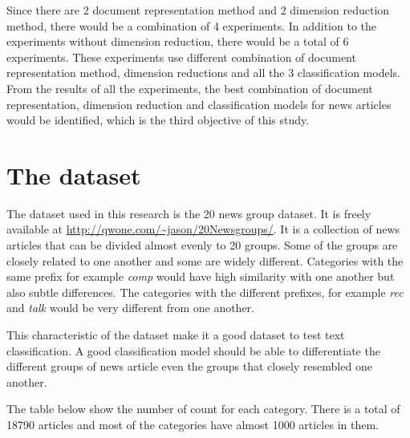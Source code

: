 Since there are 2 document representation method and 2 dimension reduction method, there would be a combination of 4 experiments. In addition to the experiments without dimension reduction, there would be a total of 6 experiments. These experiments use different combination of document representation method, dimension reductions and all the 3 classification models. From the results of all the experiments, the best combination of document representation, dimension reduction and classification models for news articles would be identified, which is the third objective of this study.\\

\section{The dataset}
\graphicspath{{./images/}}

The dataset used in this research is the 20 news group dataset. It is freely available at \url{http://qwone.com/~jason/20Newsgroups/}. It is a collection of news articles that can be divided almost evenly to 20 groups. Some of the groups are closely related to one another and some are widely different. Categories with the same prefix for example \textit{comp} would have high similarity with one another but also subtle differences. The categories with the different prefixes, for example \textit{rec} and \textit{talk} would be very different from one another.

This characteristic of the dataset make it a good dataset to test text classification. A good classification model should be able to differentiate the different groups of news article even the groups that closely resembled one another.

The table below show the number of count for each category. There is a total of 18790 articles and most of the categories have almost 1000 articles in them. 

